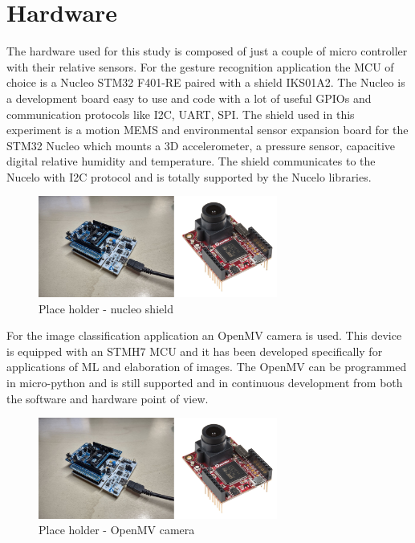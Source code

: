 \documentclass[12pt]{report}
\begin{document}
\chapter{Hardware} 
The hardware used for this study is composed of just a couple of micro controller with their relative sensors. For the gesture recognition application the MCU of choice is a Nucleo STM32 F401-RE paired with a shield IKS01A2. The Nucleo is a development board easy to use and code with a lot of useful GPIOs and communication protocols like I2C, UART, SPI. The shield \cite{shield_web_page} used in this experiment is a motion MEMS and environmental sensor expansion board for the STM32 Nucleo which mounts a 3D accelerometer, a pressure sensor, capacitive digital relative humidity and temperature. The shield communicates to the Nucelo with I2C protocol and is totally supported by the Nucelo libraries. 
%
\begin{figure}[h!]
    \centering
    \includegraphics[width=0.7\textwidth]{Figures/Chapter2/hardware.jpg} 
    \caption{Place holder - nucleo shield}
    \label{fig:hardware_stm}    
\end{figure}
%
For the image classification application an OpenMV camera is used. This device is equipped with an STMH7 MCU and it has been developed specifically for applications of ML and elaboration of images. The OpenMV \cite{openmv_web_page} can be programmed in micro-python and is still supported and in continuous development from both the software and hardware point of view. 
%
\begin{figure}[h!]
    \centering
    \includegraphics[width=0.7\textwidth]{Figures/Chapter2/hardware.jpg} 
    \caption{Place holder - OpenMV camera}
    \label{fig:hardware_openmv}    
\end{figure}
%
\end{document}
